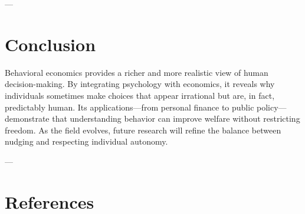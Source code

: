 \documentclass[11pt]{book}
\begin{document}
---

\section*{Conclusion}

Behavioral economics provides a richer and more realistic view of human decision-making.  
By integrating psychology with economics, it reveals why individuals sometimes make choices that appear irrational but are, in fact, predictably human.  
Its applications—from personal finance to public policy—demonstrate that understanding behavior can improve welfare without restricting freedom.  
As the field evolves, future research will refine the balance between nudging and respecting individual autonomy.

---

\section*{References}
\begingroup
\renewcommand{\section}[2]{}%
\end{document}
